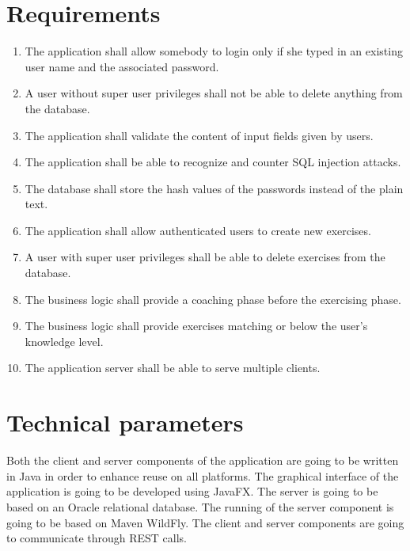 \documentclass[a4paper]{article}
\begin{document}
	
	\section{Requirements}
	\begin{enumerate}
		\item The application shall allow somebody to login only if she typed in an existing user name and the associated password.
		\item A user without super user privileges shall not be able to delete anything from the database.
		\item The application shall validate the content of input fields given by users.
		\item The application shall be able to recognize and counter SQL injection attacks.
		\item The database shall store the hash values of the passwords instead of the plain text.
		\item The application shall allow authenticated users to create new exercises.
		\item A user with super user privileges shall be able to delete exercises from the database.
		\item The business logic shall provide a coaching phase before the exercising phase.
		\item The business logic shall provide exercises matching or below the user's knowledge level.
		\item The application server shall be able to serve multiple clients. 

	\end{enumerate}
	
	\section{Technical parameters}
	Both the client and server components of the application are going to be written in Java in order to enhance reuse on all platforms. The graphical interface of the application is going to be developed using JavaFX. The server is going to be based on an Oracle relational database. The running of the server component is going to be based on Maven WildFly. The client and server components are going to communicate through REST calls.
	
\end{document}
